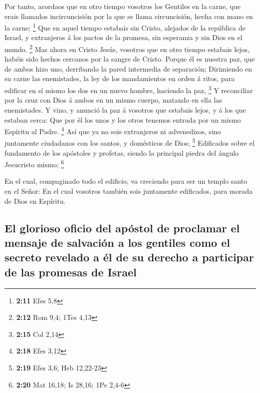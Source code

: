  Por tanto, acordaos que en otro tiempo vosotros los
Gentiles en la carne, que erais llamados incircuncisión por la que se
llama circuncisión, hecha con mano en la carne; \footnote{\textbf{2:11}
  Efes 5,8}  Que en aquel tiempo estabais sin Cristo,
alejados de la república de Israel, y extranjeros á los pactos de la
promesa, sin esperanza y sin Dios en el mundo. \footnote{\textbf{2:12}
  Rom 9,4; 1Tes 4,13}  Mas ahora en Cristo Jesús, vosotros
que en otro tiempo estabais lejos, habéis sido hechos cercanos por la
sangre de Cristo.  Porque él es nuestra paz, que de ambos
hizo uno, derribando la pared intermedia de separación; 
Dirimiendo en su carne las enemistades, la ley de los mandamientos en
orden á ritos, para edificar en sí mismo los dos en un nuevo hombre,
haciendo la paz, \footnote{\textbf{2:15} Col 2,14}  Y
reconciliar por la cruz con Dios á ambos en un mismo cuerpo, matando en
ella las enemistades.  Y vino, y anunció la paz á vosotros
que estabais lejos, y á los que estaban cerca:  Que por él
los unos y los otros tenemos entrada por un mismo Espíritu al Padre.
\footnote{\textbf{2:18} Efes 3,12}  Así que ya no sois
extranjeros ni advenedizos, sino juntamente ciudadanos con los santos, y
domésticos de Dios; \footnote{\textbf{2:19} Efes 3,6; Heb 12,22-23}
 Edificados sobre el fundamento de los apóstoles y
profetas, siendo la principal piedra del ángulo Jesucristo mismo;
\footnote{\textbf{2:20} Mat 16,18; Is 28,16; 1Pe 2,4-6}

 En el cual, compaginado todo el edificio, va creciendo
para ser un templo santo en el Señor:  En el cual vosotros
también sois juntamente edificados, para morada de Dios en Espíritu.

\hypertarget{el-glorioso-oficio-del-apuxf3stol-de-proclamar-el-mensaje-de-salvaciuxf3n-a-los-gentiles-como-el-secreto-revelado-a-uxe9l-de-su-derecho-a-participar-de-las-promesas-de-israel}{%
\subsection{El glorioso oficio del apóstol de proclamar el mensaje de
salvación a los gentiles como el secreto revelado a él de su derecho a
participar de las promesas de
Israel}\label{el-glorioso-oficio-del-apuxf3stol-de-proclamar-el-mensaje-de-salvaciuxf3n-a-los-gentiles-como-el-secreto-revelado-a-uxe9l-de-su-derecho-a-participar-de-las-promesas-de-israel}}

